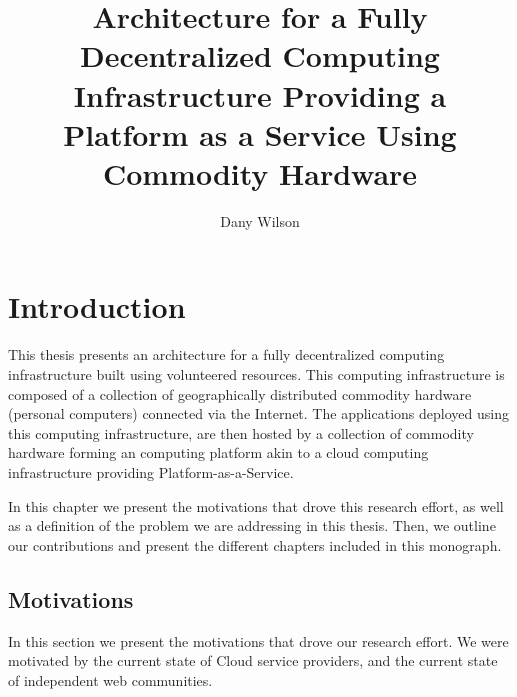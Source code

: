 \documentclass[12pt, titlepage]{uo_temp}
\title{Architecture for a Fully Decentralized Computing Infrastructure Providing a
  Platform as a Service Using Commodity Hardware}
\author{Dany Wilson}
\begin{document}


\maketitle 
\makeglossaries

\tableofcontents
\clearpage

\printglossary
\clearpage


     \chapter{Introduction}
     This thesis presents an architecture for a fully decentralized computing
     infrastructure built using volunteered resources. This computing infrastructure
     is composed of a collection of geographically distributed commodity hardware
     (personal computers) connected via the Internet. The applications deployed using this
     computing infrastructure, are then hosted by a collection of commodity hardware
     forming an computing platform akin to a cloud computing infrastructure providing
     Platform-as-a-Service.    
     
     In this chapter we present the motivations that drove this research effort, as well
     as a definition of the problem we are addressing in this thesis. Then, we outline our
     contributions and present the different chapters included in this monograph.

     \section{Motivations}
     In this section we present the motivations that drove our research effort. We were
     motivated by the current state of Cloud service providers, and the current state of
     independent web communities.
     
\end{document}

